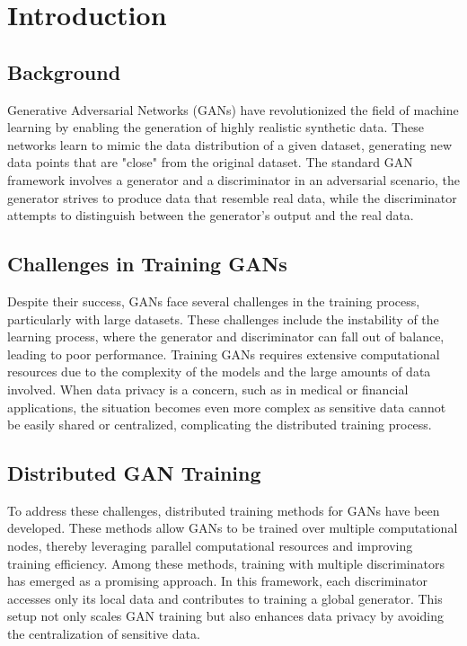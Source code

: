 \chapter{Introduction}

\section{Background}
Generative Adversarial Networks (GANs) have revolutionized the field of machine learning by enabling the generation of highly realistic synthetic data. These networks learn to mimic the data distribution of a given dataset, generating new data points that are "close" from the original dataset. The standard GAN framework involves a generator and a discriminator in an adversarial scenario, the generator strives to produce data that resemble real data, while the discriminator attempts to distinguish between the generator's output and the real data.

\section{Challenges in Training GANs}
Despite their success, GANs face several challenges in the training process, particularly with large datasets. These challenges include the instability of the learning process, where the generator and discriminator can fall out of balance, leading to poor performance. Training GANs requires extensive computational resources due to the complexity of the models and the large amounts of data involved. When data privacy is a concern, such as in medical or financial applications, the situation becomes even more complex as sensitive data cannot be easily shared or centralized, complicating the distributed training process.

\section{Distributed GAN Training}
To address these challenges, distributed training methods for GANs have been developed. These methods allow GANs to be trained over multiple computational nodes, thereby leveraging parallel computational resources and improving training efficiency. Among these methods, training with multiple discriminators has emerged as a promising approach. In this framework, each discriminator accesses only its local data and contributes to training a global generator. This setup not only scales GAN training but also enhances data privacy by avoiding the centralization of sensitive data.

